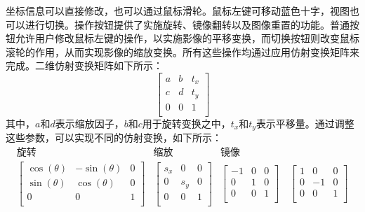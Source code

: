 坐标信息可以直接修改，也可以通过鼠标滑轮。鼠标左键可移动蓝色十字，视图也可以进行切换。操作按钮提供了实施旋转、镜像翻转以及图像重置的功能。普通按钮允许用户修改鼠标左键的操作，以实施影像的平移变换，而切换按钮则改变鼠标滚轮的作用，从而实现影像的缩放变换。所有这些操作均通过应用仿射变换矩阵来完成。二维仿射变换矩阵如下所示：
\begin{equation}
  \left[
    \begin{array}{ccc}
      a & b & t_x \\
      c & d & t_y \\
      0 & 0 & 1   \\
    \end{array}
    \right]
  \label{eq:chap05_affine_mat}
\end{equation}
其中，\(a\)和\(d\)表示缩放因子，\(b\)和\(c\)用于旋转变换之中，\(t_x\)和\(t_y\)表示平移量。通过调整这些参数，可以实现不同的仿射变换，如下所示：
\begin{equation}
  \begin{array}{ccc}
    \text{旋转} & \text{缩放} & \text{镜像} \\
    \left[
      \begin{array}{ccc}
        \cos(\theta) & -\sin(\theta) & 0 \\
        \sin(\theta) & \cos(\theta)  & 0 \\
        0            & 0             & 1 \\
      \end{array}
    \right]     &
    \left[
      \begin{array}{ccc}
        s_x & 0   & 0 \\
        0   & s_y & 0 \\
        0   & 0   & 1 \\
      \end{array}
    \right]     &
    \left[
      \begin{array}{ccc}
        -1 & 0 & 0 \\
        0  & 1 & 0 \\
        0  & 0 & 1 \\
      \end{array}
      \right] \quad
    \left[
      \begin{array}{ccc}
        1 & 0  & 0 \\
        0 & -1 & 0 \\
        0 & 0  & 1 \\
      \end{array}
    \right]                                 \\
  \end{array}
  \label{eq:chap05_affine}
\end{equation}
